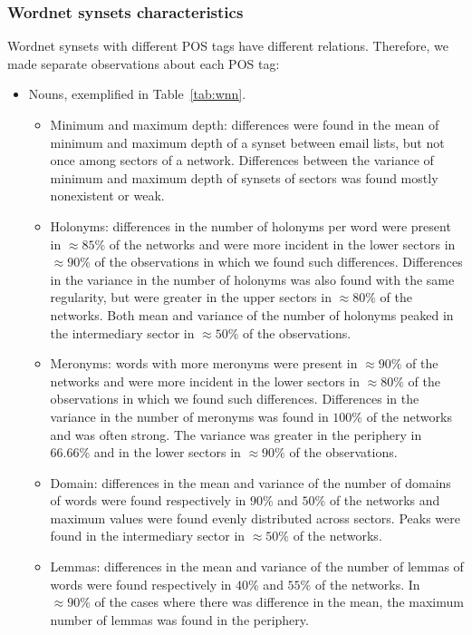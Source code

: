 \subsubsection{Wordnet synsets characteristics}\label{subsec:wn1}
Wordnet synsets with different POS tags have different relations.
Therefore, we made separate observations about each POS tag:
\begin{itemize}
	\item Nouns, exemplified in Table~\ref{tab:wnn}.

		\begin{itemize}
			\item Minimum and maximum depth: 
				differences were found in the mean of minimum and maximum depth of a synset between email lists,
		but not once among sectors of a network.
		Differences between the variance of minimum and maximum depth of synsets of sectors was found mostly nonexistent or weak.
			\item Holonyms:
				differences in the number of holonyms per word were present in $\approx 85\%$ of the networks and were
		more incident in the lower sectors in $\approx 90\%$ of the observations in which we found such differences.
		Differences in the variance in the number of holonyms was also found with the same regularity,
		but were greater in the upper sectors in $\approx 80\%$ of the networks.
				Both mean and variance of the number of holonyms peaked in the intermediary sector in $\approx50\%$ of the observations.
			\item Meronyms:
				words with more meronyms were present in $\approx 90\%$ of the networks and were
		more incident in the lower sectors in $\approx 80\%$ of the observations in which we found such differences.
			Differences in the variance in the number of meronyms was found in $100\%$ of the networks and was often strong.
				The variance was greater in the periphery in $66.66\%$ and in the lower sectors in $\approx 90\%$ of the observations.
			\item Domain:
				differences in the mean and variance of the number of domains of words were found respectively in $90\%$ and $50\%$ of the networks and maximum values were found evenly distributed across sectors.
				Peaks were found in the intermediary sector in $\approx 50\%$ of the networks.
			\item Lemmas:
				differences in the mean and variance of the number of lemmas of words were found respectively in $40\%$ and $55\%$ of the networks.
				In $\approx 90\%$ of the cases where there was difference in the mean, the maximum number of lemmas was found in the periphery.

\end{itemize}
\end{itemize}
